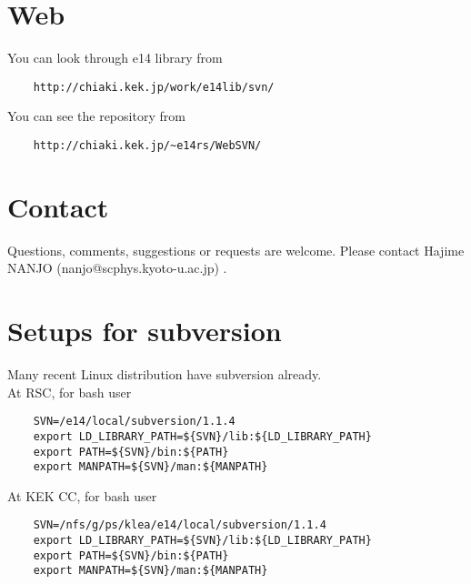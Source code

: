 \documentclass[a4paper,12pt]{article}
\begin{document}
 \section{Web}
   You can look through e14 library from
   \begin{verbatim}
	http://chiaki.kek.jp/work/e14lib/svn/	
   \end{verbatim}
   You can see the repository from
   \begin{verbatim}
	http://chiaki.kek.jp/~e14rs/WebSVN/
   \end{verbatim}

 \section{Contact}
   Questions, comments, suggestions or requests are welcome.
   Please contact Hajime NANJO (nanjo@scphys.kyoto-u.ac.jp) .
   
  \newpage 
  \appendix
  \section{Setups for subversion}
  Many recent Linux distribution have subversion already.\\
  At RSC, for bash user
  \begin{verbatim}
	SVN=/e14/local/subversion/1.1.4
	export LD_LIBRARY_PATH=${SVN}/lib:${LD_LIBRARY_PATH}
	export PATH=${SVN}/bin:${PATH}
	export MANPATH=${SVN}/man:${MANPATH}
  \end{verbatim}
  At KEK CC, for bash user
  \begin{verbatim}
	SVN=/nfs/g/ps/klea/e14/local/subversion/1.1.4
	export LD_LIBRARY_PATH=${SVN}/lib:${LD_LIBRARY_PATH}
	export PATH=${SVN}/bin:${PATH}
	export MANPATH=${SVN}/man:${MANPATH}
  \end{verbatim}
\end{document}

